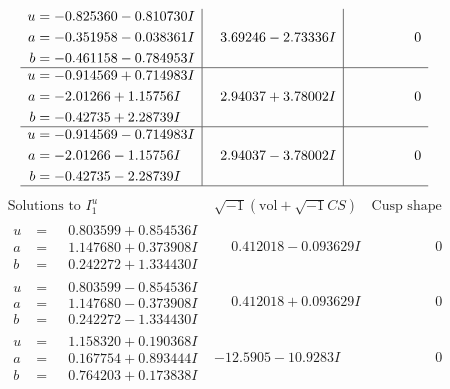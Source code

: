 \documentclass[1p]{elsarticle_modified}
\theoremstyle{definition}
\newcommand{\I}{\sqrt{-1}}
\begin{document}
$$\begin{array}{c|c|c}
\begin{aligned}
u &= -0.825360 - 0.810730 I \\
a &= -0.351958 - 0.038361 I \\
b &= -0.461158 - 0.784953 I\end{aligned}
 & \phantom{-}3.69246 - 2.73336 I & \phantom{-0.000000 } 0 \\ \hline\begin{aligned}
u &= -0.914569 + 0.714983 I \\
a &= -2.01266 + 1.15756 I \\
b &= -0.42735 + 2.28739 I\end{aligned}
 & \phantom{-}2.94037 + 3.78002 I & \phantom{-0.000000 } 0 \\ \hline\begin{aligned}
u &= -0.914569 - 0.714983 I \\
a &= -2.01266 - 1.15756 I \\
b &= -0.42735 - 2.28739 I\end{aligned}
 & \phantom{-}2.94037 - 3.78002 I & \phantom{-0.000000 } 0\\
 \hline 
 \end{array}$$\newpage$$\begin{array}{c|c|c}  
\text{Solutions to }I^u_{1}& \I (\text{vol} + \sqrt{-1}CS) & \text{Cusp shape}\\
 \hline 
\begin{aligned}
u &= \phantom{-}0.803599 + 0.854536 I \\
a &= \phantom{-}1.147680 + 0.373908 I \\
b &= \phantom{-}0.242272 + 1.334430 I\end{aligned}
 & \phantom{-}0.412018 - 0.093629 I & \phantom{-0.000000 } 0 \\ \hline\begin{aligned}
u &= \phantom{-}0.803599 - 0.854536 I \\
a &= \phantom{-}1.147680 - 0.373908 I \\
b &= \phantom{-}0.242272 - 1.334430 I\end{aligned}
 & \phantom{-}0.412018 + 0.093629 I & \phantom{-0.000000 } 0 \\ \hline\begin{aligned}
u &= \phantom{-}1.158320 + 0.190368 I \\
a &= \phantom{-}0.167754 + 0.893444 I \\
b &= \phantom{-}0.764203 + 0.173838 I\end{aligned}
 & -12.5905 - 10.9283 I & \phantom{-0.000000 } 0 \\ \hline\begin{aligned}

\end{aligned}
\end{array}$$
\end{document}
